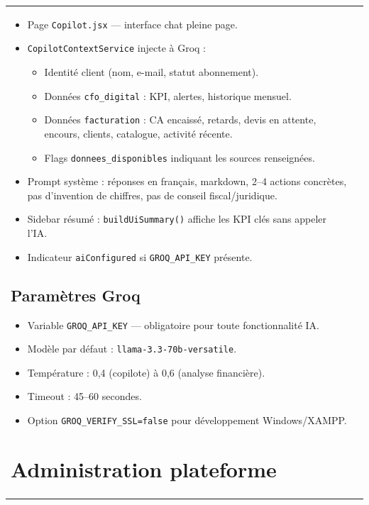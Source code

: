 \documentclass[11pt,a4paper]{report}
\newcommand{\svc}[1]{\texttt{\small #1}}
\begin{document}
\begin{longtable}{@{}p{3.5cm}p{10.2cm}@{}}
\begin{itemize}[leftmargin=*]
    \item Page \texttt{Copilot.jsx} — interface chat pleine page.
    \item \svc{CopilotContextService} injecte à Groq :
    \begin{itemize}
        \item Identité client (nom, e-mail, statut abonnement).
        \item Données \texttt{cfo\_digital} : KPI, alertes, historique mensuel.
        \item Données \texttt{facturation} : CA encaissé, retards, devis en attente, encours, clients, catalogue, activité récente.
        \item Flags \texttt{donnees\_disponibles} indiquant les sources renseignées.
    \end{itemize}
    \item Prompt système : réponses en français, markdown, 2--4 actions concrètes, pas d'invention de chiffres, pas de conseil fiscal/juridique.
    \item Sidebar résumé : \texttt{buildUiSummary()} affiche les KPI clés sans appeler l'IA.
    \item Indicateur \texttt{aiConfigured} si \texttt{GROQ\_API\_KEY} présente.
\end{itemize}

\section{Paramètres Groq}

\begin{itemize}[leftmargin=*]
    \item Variable \texttt{GROQ\_API\_KEY} — obligatoire pour toute fonctionnalité IA.
    \item Modèle par défaut : \texttt{llama-3.3-70b-versatile}.
    \item Température : 0{,}4 (copilote) à 0{,}6 (analyse financière).
    \item Timeout : 45--60 secondes.
    \item Option \texttt{GROQ\_VERIFY\_SSL=false} pour développement Windows/XAMPP.
\end{itemize}

\chapter{Administration plateforme}


\end{longtable}
\end{document}
